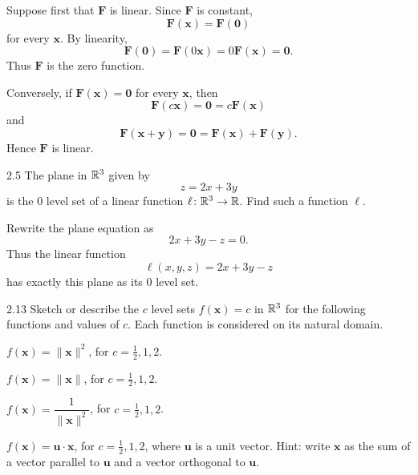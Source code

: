 \documentclass[11pt,oneside]{article}
\begin{document}
\begin{solution}
Suppose first that $\mathbf F$ is linear. Since $\mathbf F$ is constant,
\[
    \mathbf F(\mathbf x)=\mathbf F(\mathbf 0)
\]
for every $\mathbf x$. By linearity,
\[
    \mathbf F(\mathbf 0)
    =\mathbf F(0\mathbf x)
    =0\mathbf F(\mathbf x)
    =\mathbf 0.
\]
Thus $\mathbf F$ is the zero function.

Conversely, if $\mathbf F(\mathbf x)=\mathbf 0$ for every $\mathbf x$, then
\[
    \mathbf F(c\mathbf x)=\mathbf 0=c\mathbf F(\mathbf x)
\]
and
\[
    \mathbf F(\mathbf x+\mathbf y)=\mathbf 0
    =\mathbf F(\mathbf x)+\mathbf F(\mathbf y).
\]
Hence $\mathbf F$ is linear.
\end{solution}

\begin{problem}{2.5}
The plane in $\mathbb{R}^3$ given by
\[
    z=2x+3y
\]
is the $0$ level set of a linear function $\ell\colon\mathbb{R}^3\to\mathbb{R}$. Find such a function $\ell$.
\end{problem}

\begin{solution}
Rewrite the plane equation as
\[
    2x+3y-z=0.
\]
Thus the linear function
\[
    \boxed{\ell(x,y,z)=2x+3y-z}
\]
has exactly this plane as its $0$ level set.
\end{solution}

\begin{problem}{2.13}
Sketch or describe the $c$ level sets $f(\mathbf x)=c$ in $\mathbb{R}^3$ for the following functions and values of $c$. Each function is considered on its natural domain.
\begin{problemsubparts}
    \item $f(\mathbf x)=\|\mathbf x\|^2$, for $c=\frac12,1,2$.
    \item $f(\mathbf x)=\|\mathbf x\|$, for $c=\frac12,1,2$.
    \item $f(\mathbf x)=\dfrac{1}{\|\mathbf x\|^2}$, for $c=\frac12,1,2$.
    \item $f(\mathbf x)=\mathbf u\cdot\mathbf x$, for $c=\frac12,1,2$, where $\mathbf u$ is a unit vector. Hint: write $\mathbf x$ as the sum of a vector parallel to $\mathbf u$ and a vector orthogonal to $\mathbf u$.
\end{problemsubparts}
\end{problem}
\end{document}
